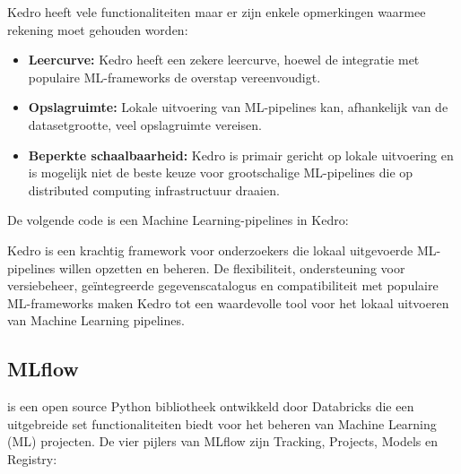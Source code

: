 Kedro heeft vele functionaliteiten maar er zijn enkele opmerkingen waarmee rekening moet gehouden worden:

\begin{itemize}
    \item \textbf{Leercurve:} Kedro heeft een zekere leercurve, hoewel de integratie met populaire ML-frameworks de overstap vereenvoudigt.
    \item \textbf{Opslagruimte:} Lokale uitvoering van ML-pipelines kan, afhankelijk van de datasetgrootte, veel opslagruimte vereisen.
    \item \textbf{Beperkte schaalbaarheid:} Kedro is primair gericht op lokale uitvoering en is mogelijk niet de beste keuze voor grootschalige ML-pipelines die op distributed computing infrastructuur draaien.
\end{itemize}


De volgende code is een Machine Learning-pipelines in Kedro: 


Kedro is een krachtig framework voor onderzoekers die lokaal uitgevoerde ML-pipelines willen opzetten en beheren. De flexibiliteit, ondersteuning voor versiebeheer, geïntegreerde gegevenscatalogus en compatibiliteit met populaire ML-frameworks maken Kedro tot een waardevolle tool voor het lokaal uitvoeren van Machine Learning pipelines.

\subsection{MLflow}

\textcite{MLflow2023} is een open source Python bibliotheek ontwikkeld door Databricks die een uitgebreide set functionaliteiten biedt voor het beheren van Machine Learning (ML) projecten. De vier pijlers van MLflow zijn Tracking, Projects, Models en Registry:

